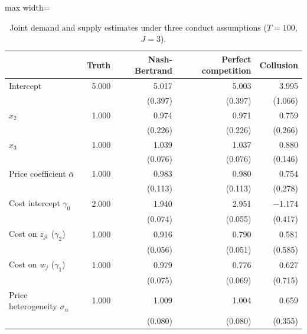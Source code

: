 \begin{table}[H]
\centering\small
\caption{Joint demand and supply estimates under three conduct assumptions ($T=100$, $J=3$).}\label{tab:q9e_estimates}
\begin{adjustbox}{max width=\linewidth}
\begin{tabular}{lrrrr}
\toprule
 & Truth & Nash-Bertrand & Perfect competition & Collusion \\
\midrule
Intercept & 5.000 & 5.017 & 5.003 & 3.995 \\
 &  & (0.397) & (0.397) & (1.066) \\
$x_{2}$ & 1.000 & 0.974 & 0.971 & 0.759 \\
 &  & (0.226) & (0.226) & (0.266) \\
$x_{3}$ & 1.000 & 1.039 & 1.037 & 0.880 \\
 &  & (0.076) & (0.076) & (0.146) \\
Price coefficient $\bar\alpha$ & 1.000 & 0.983 & 0.980 & 0.754 \\
 &  & (0.113) & (0.113) & (0.278) \\
Cost intercept $\gamma_0$ & 2.000 & 1.940 & 2.951 & $-$1.174 \\
 &  & (0.074) & (0.055) & (0.417) \\
Cost on $z_{jt}$ ($\gamma_2$) & 1.000 & 0.916 & 0.790 & 0.581 \\
 &  & (0.056) & (0.051) & (0.585) \\
Cost on $w_j$ ($\gamma_1$) & 1.000 & 0.979 & 0.776 & 0.627 \\
 &  & (0.075) & (0.069) & (0.715) \\
Price heterogeneity $\sigma_\alpha$ & 1.000 & 1.009 & 1.004 & 0.659 \\
 &  & (0.080) & (0.080) & (0.355) \\
\bottomrule
\end{tabular}
\end{adjustbox}
\par{}
\end{table}
